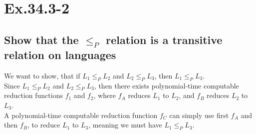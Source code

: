 \section*{Ex.34.3-2}
\subsection*{Show that the $\leq_P$ relation is a transitive relation on languages}

We want to show, that if $L_1\leq_P L_2$ and $L_2\leq_P L_3$, then $L_1\leq_P L_3$.
\\
Since $L_1\leq_P L_2$ and $L_2\leq_P L_3$, then there exists polynomial-time computable reduction functions $f_1$ and $f_2$, where $f_A$ reduces $L_1$ to $L_2$, and $f_B$ reduces $L_2$ to $L_3$.
\\
A polynomial-time computable reduction function $f_C$ can simply use first $f_A$ and then $f_B$, to reduce $L_1$ to $L_3$, meaning we must have $L_1\leq_P L_3$.